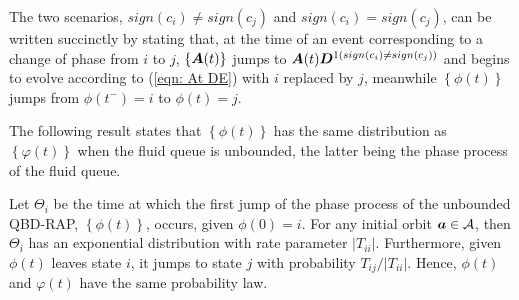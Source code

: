 The two scenarios, \(sign(c_i)\neq sign(c_j)\) and \(sign(c_i)= sign(c_j)\), can be written succinctly by stating that, at the time of an event corresponding to a change of phase from \(i\) to \(j\), \(\{\boldsymbol A(t)\}\) jumps to \(\boldsymbol A(t)\boldsymbol{D}^{1(sign(c_i)\neq sign(c_j))}\) and begins to evolve according to (\ref{eqn: At DE}) with \(i\) replaced by \(j\), meanwhile \(\left\{{\phi}(t)\right\}\) jumps from \(\phi(t^-)=i\) to \(\phi(t)=j\). %

The following result states that \(\left\{{\phi}(t)\right\}\) has the same distribution as \(\left\{{\varphi}(t)\right\}\) when the fluid queue is unbounded, the latter being the phase process of the fluid queue. 
\begin{thm}\label{thm: 1}
	Let \(\Theta_i\) be the time at which the first jump of the phase process of the unbounded QBD-RAP, \(\left\{{\phi}(t)\right\}\), occurs, given \(\phi(0)=i\). For any initial orbit \(\boldsymbol a\in\mathcal A\), then \(\Theta_i\) has an exponential distribution with rate parameter \(|T_{ii}|\). Furthermore, given \({\phi}(t)\) leaves state \(i\), it jumps to state \(j\) with probability \(T_{ij}/|T_{ii}|\). Hence, \({\phi}(t)\) and \(\varphi(t)\) have the same probability law. 
\end{thm}
